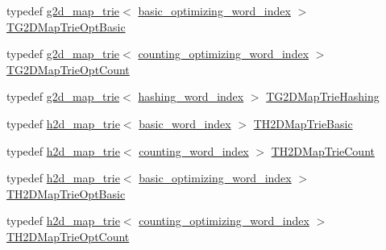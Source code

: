 \begin{DoxyCompactItemize}
\item 
typedef \hyperlink{classuva_1_1smt_1_1bpbd_1_1server_1_1lm_1_1g2d__map__trie}{g2d\+\_\+map\+\_\+trie}$<$ \hyperlink{namespaceuva_1_1smt_1_1bpbd_1_1server_1_1lm_1_1dictionary_a3001583c904eec702b4a4125082a7ecd}{basic\+\_\+optimizing\+\_\+word\+\_\+index} $>$ \hyperlink{namespaceuva_1_1smt_1_1bpbd_1_1server_1_1lm_add82ae9c6e35ced16e2bab4082204f5c}{T\+G2\+D\+Map\+Trie\+Opt\+Basic}
\item 
typedef \hyperlink{classuva_1_1smt_1_1bpbd_1_1server_1_1lm_1_1g2d__map__trie}{g2d\+\_\+map\+\_\+trie}$<$ \hyperlink{namespaceuva_1_1smt_1_1bpbd_1_1server_1_1lm_1_1dictionary_a61cbd647b15de785ccf4cdd26661c366}{counting\+\_\+optimizing\+\_\+word\+\_\+index} $>$ \hyperlink{namespaceuva_1_1smt_1_1bpbd_1_1server_1_1lm_a959c20502ff1c42c334d2539e2b00b1d}{T\+G2\+D\+Map\+Trie\+Opt\+Count}
\item 
typedef \hyperlink{classuva_1_1smt_1_1bpbd_1_1server_1_1lm_1_1g2d__map__trie}{g2d\+\_\+map\+\_\+trie}$<$ \hyperlink{classuva_1_1smt_1_1bpbd_1_1server_1_1lm_1_1dictionary_1_1hashing__word__index}{hashing\+\_\+word\+\_\+index} $>$ \hyperlink{namespaceuva_1_1smt_1_1bpbd_1_1server_1_1lm_a9489cf38c3a8b7c72eed9f82e66e9c82}{T\+G2\+D\+Map\+Trie\+Hashing}
\item 
typedef \hyperlink{classuva_1_1smt_1_1bpbd_1_1server_1_1lm_1_1h2d__map__trie}{h2d\+\_\+map\+\_\+trie}$<$ \hyperlink{classuva_1_1smt_1_1bpbd_1_1server_1_1lm_1_1dictionary_1_1basic__word__index}{basic\+\_\+word\+\_\+index} $>$ \hyperlink{namespaceuva_1_1smt_1_1bpbd_1_1server_1_1lm_aa53359be0261f651cda52366e67b368f}{T\+H2\+D\+Map\+Trie\+Basic}
\item 
typedef \hyperlink{classuva_1_1smt_1_1bpbd_1_1server_1_1lm_1_1h2d__map__trie}{h2d\+\_\+map\+\_\+trie}$<$ \hyperlink{classuva_1_1smt_1_1bpbd_1_1server_1_1lm_1_1dictionary_1_1counting__word__index}{counting\+\_\+word\+\_\+index} $>$ \hyperlink{namespaceuva_1_1smt_1_1bpbd_1_1server_1_1lm_a16a3c338c8c70fdcef33b4ef40c645d6}{T\+H2\+D\+Map\+Trie\+Count}
\item 
typedef \hyperlink{classuva_1_1smt_1_1bpbd_1_1server_1_1lm_1_1h2d__map__trie}{h2d\+\_\+map\+\_\+trie}$<$ \hyperlink{namespaceuva_1_1smt_1_1bpbd_1_1server_1_1lm_1_1dictionary_a3001583c904eec702b4a4125082a7ecd}{basic\+\_\+optimizing\+\_\+word\+\_\+index} $>$ \hyperlink{namespaceuva_1_1smt_1_1bpbd_1_1server_1_1lm_a7b17b8a558ebd81c8e153c3767d65b4a}{T\+H2\+D\+Map\+Trie\+Opt\+Basic}
\item 
typedef \hyperlink{classuva_1_1smt_1_1bpbd_1_1server_1_1lm_1_1h2d__map__trie}{h2d\+\_\+map\+\_\+trie}$<$ \hyperlink{namespaceuva_1_1smt_1_1bpbd_1_1server_1_1lm_1_1dictionary_a61cbd647b15de785ccf4cdd26661c366}{counting\+\_\+optimizing\+\_\+word\+\_\+index} $>$ \hyperlink{namespaceuva_1_1smt_1_1bpbd_1_1server_1_1lm_a1ff5e5e7b88a2dbde50873a38d1700ce}{T\+H2\+D\+Map\+Trie\+Opt\+Count}

\end{DoxyCompactItemize}
